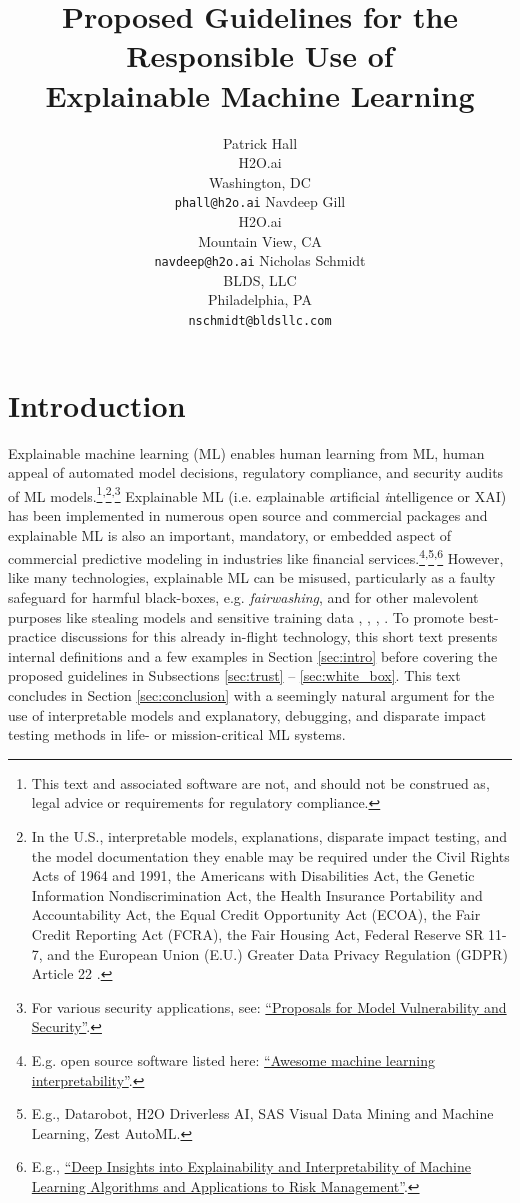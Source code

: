 \documentclass{article}
\title{Proposed Guidelines for the Responsible Use of\\ Explainable Machine Learning}
\author{Patrick Hall\\
H2O.ai\\
Washington, DC\\
\texttt{phall@h2o.ai} \And
Navdeep Gill\\
H2O.ai\\
Mountain View, CA\\
\texttt{navdeep@h2o.ai} \And
Nicholas Schmidt\\
BLDS, LLC\\
Philadelphia, PA\\
\texttt{nschmidt@bldsllc.com}
}
\begin{document}
\maketitle

\section{Introduction}

Explainable machine learning (ML) enables human learning from ML, human appeal of automated model decisions, regulatory compliance, and security audits of ML models.\footnote{\scriptsize{This text and associated software are not, and should not be construed as, legal advice or requirements for regulatory compliance.}}\textsuperscript{,}\footnote{\scriptsize{In the U.S., interpretable models, explanations, disparate impact testing, and the model documentation they enable may be required under the Civil Rights Acts of 1964 and 1991, the Americans with Disabilities Act, the Genetic Information Nondiscrimination Act, the Health Insurance Portability and Accountability Act, the Equal Credit Opportunity Act (ECOA), the Fair Credit Reporting Act (FCRA), the Fair Housing Act, Federal Reserve SR 11-7, and the European Union (E.U.) Greater Data Privacy Regulation (GDPR) Article 22 \cite{ff_interpretability}}.\label{fn:regs}}\textsuperscript{,}\footnote{\scriptsize{For various security applications, see: \href{https://www.oreilly.com/ideas/proposals-for-model-vulnerability-and-security}{``Proposals for Model Vulnerability and Security''}.}} Explainable ML (i.e. e\textit{x}plainable \textit{a}rtificial \textit{i}ntelligence or XAI) has been implemented in numerous open source and commercial packages and explainable ML is also an important, mandatory, or embedded aspect of commercial predictive modeling in industries like financial services.\footnote{\scriptsize{E.g. open source software listed here: \href{https://github.com/jphall663/awesome-machine-learning-interpretability}{``Awesome machine learning interpretability''}.}}\textsuperscript{,}\footnote{\scriptsize{E.g.,  Datarobot, H2O Driverless AI, SAS Visual Data Mining and Machine Learning, Zest AutoML.}}\textsuperscript{,}\footnote{\scriptsize{E.g., \href{https://ww2.amstat.org/meetings/jsm/2019/onlineprogram/AbstractDetails.cfm?abstractid=303053}{``Deep Insights into Explainability and Interpretability of Machine Learning Algorithms and Applications to Risk Management''}.}\label{fn:chen}} However, like many technologies, explainable ML can be misused, particularly as a faulty safeguard for harmful black-boxes, e.g. \textit{fairwashing}, and for other malevolent purposes like stealing models and sensitive training data \cite{fair_washing}, \cite{please_stop}, \cite{membership_inference}, \cite{model_stealing}. To promote best-practice discussions for this already in-flight technology, this short text presents internal definitions and a few examples in Section \ref{sec:intro} before covering the proposed guidelines in Subsections \ref{sec:trust} -- \ref{sec:white_box}. This text concludes in Section \ref{sec:conclusion} with a seemingly natural argument for the use of interpretable models and explanatory, debugging, and disparate impact testing methods in life- or mission-critical ML systems.
\end{document}
